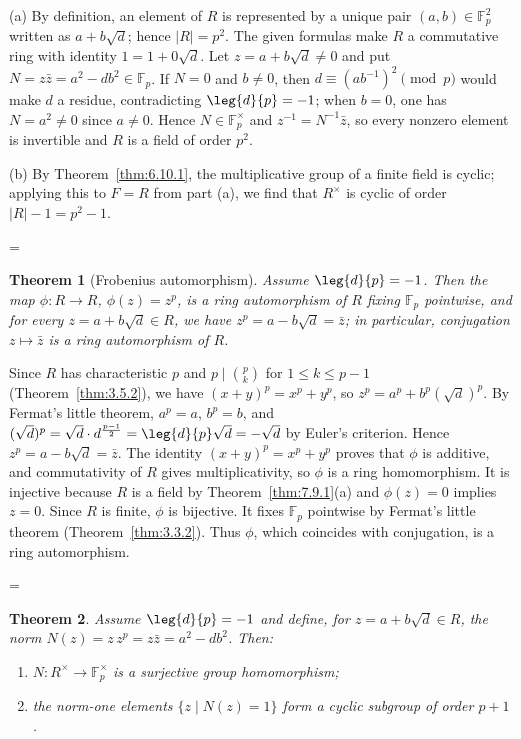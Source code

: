 \documentclass[11pt]{article}
\makeatletter
\theoremstyle{ntstyle}
\newtheorem{theorem}{Theorem}[subsection]
\let\nt@closedisplay\]
\def\nt@guardedclose{\@ifnextchar\par{\nt@closeafterpar}{\@ifnextchar\end{\postdisplaypenalty\@M\nt@closedisplay}{\nt@closedisplay}}}
\def\nt@closeafterpar\par{\@ifnextchar\par{\nt@closeafterpar}{\@ifnextchar\end{\postdisplaypenalty\@M\nt@closedisplay\par}{\nt@closedisplay\par}}}
\renewenvironment{proof}[1][\proofname]{\par
  \pushQED{\qed}\normalfont\topsep\medskipamount\edef\nt@afterproof{\@endparpenalty=\the\@endparpenalty\relax}\@beginparpenalty\@M\@endparpenalty\@M\let\]\nt@guardedclose\trivlist\item[]\textit{#1\@addpunct{.}} \ignorespaces}{\ifvmode\addpenalty\@M\fi\popQED\nt@afterproof\endtrivlist\@endpefalse}
\makeatother
\begin{document}
\begin{proof} (a) By definition, an element of $R$ is represented by a
	unique pair $(a,b)\in\mathbb{F}_p^2$ written as $a+b\sqrt{d}$; hence
	$|R|=p^2$. The given formulas make $R$ a commutative ring with
	identity $1 = 1 + 0\sqrt{d}$. Let $z = a + b\sqrt{d} \neq 0$ and put
	$N = z\bar z = a^2 - d b^2 \in \mathbb{F}_p$. If $N = 0$ and $b
		\neq 0$, then $d \equiv (a b^{-1})^2 \pmod{p}$ would make $d$ a residue,
	contradicting $\leg{d}{p} = -1$; when $b = 0$, one has $N =
		a^2 \neq 0$ since $a \neq 0$. Hence $N \in \mathbb{F}_p^{\times}$ and
	$z^{-1} = N^{-1}\bar z$, so every nonzero element is invertible and
	$R$ is a field of order $p^2$.

	(b) By Theorem~\ref{thm:6.10.1}, the multiplicative group of a finite field
	is cyclic; applying this to $F=R$ from part (a), we find that $R^{\times}$ is cyclic of
	order $|R|-1=p^{2}-1$.

\end{proof}
\begin{theorem}[Frobenius automorphism]\label{thm:7.9.2} Assume
	$\leg{d}{p}=-1$. Then the map $\phi:R\to R$, $\phi(z)=z^{p}$, is a ring
	automorphism of $R$ fixing $\mathbb{F}_p$ pointwise, and for every
	$z = a + b\sqrt{d} \in R$, we have $z^p = a - b\sqrt{d} = \bar z$; in particular,
	conjugation $z\mapsto\bar z$ is a ring automorphism of $R$.

\end{theorem}

\begin{proof} Since $R$ has characteristic $p$ and $p \mid
		\binom{p}{k}$ for $1 \le k \le p-1$ (Theorem~\ref{thm:3.5.2}), we have $(x + y)^p = x^p + y^p$, so $z^p = a^p + b^p(\sqrt{d})^p$. By Fermat's little theorem, $a^p = a$, $b^p =
		b$, and $(\sqrt{d})^p = \sqrt{d} \cdot d^{\frac{p-1}{2}} =
		\leg{d}{p}\sqrt{d} = -\sqrt{d}$ by Euler's criterion. Hence
	$z^p = a - b\sqrt{d} = \bar z$. The identity $(x+y)^p=x^p+y^p$ proves that
	$\phi$ is additive, and commutativity of $R$ gives multiplicativity, so $\phi$ is a ring
	homomorphism. It is injective because $R$ is a field by
	Theorem~\ref{thm:7.9.1}(a) and $\phi(z)=0$ implies $z=0$. Since $R$ is finite, $\phi$ is bijective.
	It fixes $\mathbb{F}_p$ pointwise by Fermat's little theorem
	(Theorem~\ref{thm:3.3.2}). Thus $\phi$, which coincides with conjugation, is a ring automorphism.

\end{proof}
\begin{theorem}\label{thm:7.9.3} Assume
	$\leg{d}{p}=-1$ and define, for $z = a + b\sqrt{d} \in R$,
	the norm $N(z) = z\, z^p = z\bar z = a^2 - d b^2$. Then:
	\begin{enumerate}[label={\alph*)}]
		\item $N : R^{\times} \to \mathbb{F}_p^{\times}$ is a surjective
		      group homomorphism;
		\item the norm-one elements $\{z \mid N(z) = 1\}$ form a cyclic
		      subgroup of order $p + 1$.
	\end{enumerate}

\end{theorem}
\end{document}
